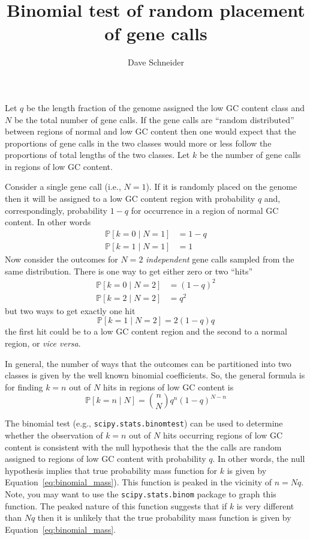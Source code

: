 \documentclass[12pt]{article}
\title{Binomial test of random placement\\
  of gene calls}
\author{Dave Schneider}
\renewcommand{\Pr}[1]{\ensuremath{\mathbb{P}\left[#1\right]}}
\begin{document}
\maketitle

Let $q$ be the length fraction of the genome assigned the low GC
content class and $N$ be the total number of gene calls.  If the gene
calls are ``random distributed'' between regions of normal and low GC
content then one would expect that the proportions of gene calls in
the two classes would more or less follow the proportions of total
lengths of the two classes.  Let $k$ be the number of gene calls in
regions of low GC content.

Consider a single gene call (i.e., $N=1$).  If it is randomly placed
on the genome then it will be assigned to a low GC content region with
probability $q$ and, correspondingly, probability $1-q$ for occurrence in a region of normal GC content.  In other words
\begin{align}
  \Pr{k=0\mid N=1} & = 1 - q \\
  \Pr{k=1\mid N=1} & = 1  
\end{align}
Now consider the outcomes for $N=2$ \emph{independent} gene calls
sampled from the same distribution.  There is one way to get either
zero or two ``hits''
\begin{align}
  \Pr{k=0\mid N=2} & = \left(1 - q\right)^2 \\
  \Pr{k=2\mid N=2} & = q^2
\end{align}
but two ways to get exactly one hit
\begin{equation}
  \Pr{k=1\mid N=2} = 2\left(1-q\right)q 
\end{equation}
the first hit could be to a low GC content region and the second to a
normal region, or \emph{vice versa}.

In general, the number of ways that the outcomes can be partitioned
into two classes is given by the well known binomial coefficients.
So, the general formula is for finding $k=n$ out of $N$ hits in
regions of low GC content is
\begin{equation}
  \Pr{k=n \mid N} = \binom{n}{N} q^{n}\left(1-q\right)^{N-n}
  \label{eq:binomial_mass}
\end{equation}

The binomial test (e.g., \texttt{scipy.stats.binomtest}) can be used
to determine whether the observation of $k=n$ out of $N$ hits
occurring regions of low GC content is consistent with the null
hypothesis that the the calls are random assigned to regions of low GC
content with probability $q$.  In other words, the null hypothesis
implies that true probability mass function for $k$ is given by
Equation~\ref{eq:binomial_mass}). This function is peaked in the
vicinity of $n=Nq$.  Note, you may want to use the
\texttt{scipy.stats.binom} package to graph this function.  The peaked
nature of this function suggests that if $k$ is very different than
$Nq$ then it is unlikely that the true probability mass function is
given by Equation~\ref{eq:binomial_mass}.
\end{document}
